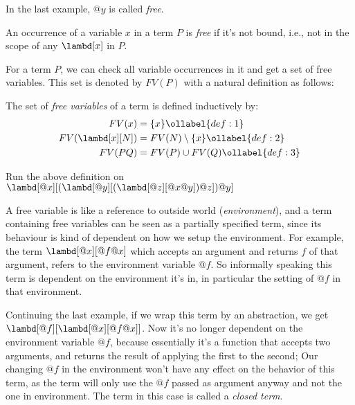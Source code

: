 \documentclass[../../../include/open-logic-section]{subfiles}
\begin{document}
In the last example, $@y$ is called \emph{free}. 
\begin{defn}
  An occurrence of a variable $x$ in a term $P$ is \emph{free} if it's not bound, i.e., not in the scope of any
  $\lambd[x]$ in $P$.
\end{defn}


For a term $P$, we can check all variable occurrences in it and get a set of free
variables. This set is denoted by $FV(P)$ with a natural definition
as follows:

\begin{defn} 
  The set of \emph{free variables} of a term is defined inductively by:
  \begin{align} 
    FV(x) &= \{x\} \ollabel{def:1} \\
    FV(\lambd[x][N]) &= FV(N) \setminus \{x\}    \ollabel{def:2} \\
    FV(PQ) &= FV(P) \cup FV(Q) \ollabel{def:3}
  \end{align}
\end{defn}

\begin{prob}
  Run the above definition on $\lambd[@x][(\lambd[@y][(\lambd[@z][@x @y]) @z]) @y]$
\end{prob}

\begin{explain}
A free variable is like a reference to outside world (\emph{environment}), and a term
containing free variables can be seen as a partially specified term,
since its behaviour is kind of dependent on how we setup the
environment. For example, the term $\lambd[@x][@f @x]$ which
accepts an argument and returns $f$ of that argument, refers to the environment variable
$@f$. So informally speaking this term is dependent on the environment
it's in, in particular the setting of $@f$ in that environment.

Continuing the last example, if we wrap this term by an abstraction, we get
$\lambd[@f][\lambd[@x][@f @x]]$. Now it's no longer dependent on
the environment variable $@f$, because essentially it's a function that
accepts two arguments, and returns the result of applying the first to
the second; Our changing $@f$ in the environment won't have any
effect on the behavior of this term, as the term will only use the $@f$
passed as argument anyway and not the one in environment. The term
in this case is called a \emph{closed term}.
\end{explain}
\end{document}
